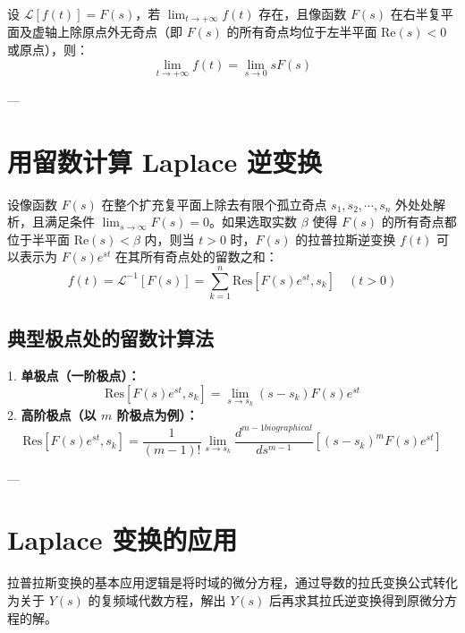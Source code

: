 \begin{tcolorbox}[colback=teal!5!white, colframe=teal!75!black, title=定理 \thechapter.8 \quad 终值定理]
	设 $\mathcal{L}[f(t)] = F(s)$，若 $\lim_{t \to +\infty} f(t)$ 存在，且像函数 $F(s)$ 在右半复平面及虚轴上除原点外无奇点（即 $F(s)$ 的所有奇点均位于左半平面 $\text{Re}(s) < 0$ 或原点），则：
	$$ \lim_{t \to +\infty} f(t) = \lim_{s \to 0} sF(s) $$
\end{tcolorbox}

---

\section{用留数计算 Laplace 逆变换}

\begin{tcolorbox}[colback=teal!5!white, colframe=teal!75!black, title=定理 \thechapter.9 \quad 留数反演定理]
	设像函数 $F(s)$ 在整个扩充复平面上除去有限个孤立奇点 $s_1, s_2, \cdots, s_n$ 外处处解析，且满足条件 $\lim_{s \to \infty} F(s) = 0$。如果选取实数 $\beta$ 使得 $F(s)$ 的所有奇点都位于半平面 $\text{Re}(s) < \beta$ 内，则当 $t > 0$ 时，$F(s)$ 的拉普拉斯逆变换 $f(t)$ 可以表示为 $F(s)e^{st}$ 在其所有奇点处的留数之和：
	$$ f(t) = \mathcal{L}^{-1}[F(s)] = \sum_{k=1}^{n} \text{Res}[F(s)e^{st}, s_k] \quad (t > 0) $$
\end{tcolorbox}

\subsection{典型极点处的留数计算法}
1. \textbf{单极点（一阶极点）：}
$$ \text{Res}[F(s)e^{st}, s_k] = \lim_{s \to s_k} (s - s_k)F(s)e^{st} $$
2. \textbf{高阶极点（以 $m$ 阶极点为例）：}
$$ \text{Res}[F(s)e^{st}, s_k] = \frac{1}{(m-1)!} \lim_{s \to s_k} \frac{d^{m-1 biographical}}{ds^{m-1}} \left[ (s - s_k)^m F(s)e^{st} \right] $$

---

\section{Laplace 变换的应用}

拉普拉斯变换的基本应用逻辑是将时域的微分方程，通过导数的拉氏变换公式转化为关于 $Y(s)$ 的复频域代数方程，解出 $Y(s)$ 后再求其拉氏逆变换得到原微分方程的解。



